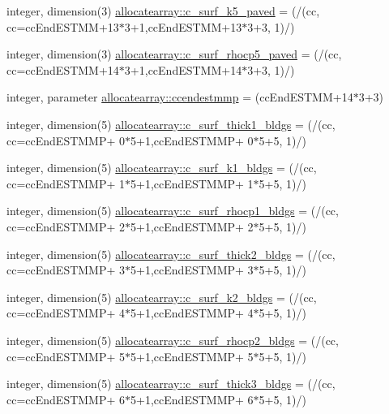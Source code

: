 \begin{DoxyCompactItemize}
\item 
integer, dimension(3) \hyperlink{namespaceallocatearray_a55ea661a6311737a605a66ff4d0686bb}{allocatearray\+::c\+\_\+surf\+\_\+k5\+\_\+paved} = (/(cc, cc=cc\+End\+E\+S\+T\+MM+13$\ast$3+1,cc\+End\+E\+S\+T\+MM+13$\ast$3+3, 1)/)
\item 
integer, dimension(3) \hyperlink{namespaceallocatearray_abfdcde71bd1c263d5cf829353a897407}{allocatearray\+::c\+\_\+surf\+\_\+rhocp5\+\_\+paved} = (/(cc, cc=cc\+End\+E\+S\+T\+MM+14$\ast$3+1,cc\+End\+E\+S\+T\+MM+14$\ast$3+3, 1)/)
\item 
integer, parameter \hyperlink{namespaceallocatearray_aea45a9a70b07fc8b92b8946a2b41e299}{allocatearray\+::ccendestmmp} = (cc\+End\+E\+S\+T\+MM+14$\ast$3+3)
\item 
integer, dimension(5) \hyperlink{namespaceallocatearray_ac6eb5a733ab48407dd1b0cd5d0bf4780}{allocatearray\+::c\+\_\+surf\+\_\+thick1\+\_\+bldgs} = (/(cc, cc=cc\+End\+E\+S\+T\+M\+MP+ 0$\ast$5+1,cc\+End\+E\+S\+T\+M\+MP+ 0$\ast$5+5, 1)/)
\item 
integer, dimension(5) \hyperlink{namespaceallocatearray_a24292d640a153248dd27a9d46e279457}{allocatearray\+::c\+\_\+surf\+\_\+k1\+\_\+bldgs} = (/(cc, cc=cc\+End\+E\+S\+T\+M\+MP+ 1$\ast$5+1,cc\+End\+E\+S\+T\+M\+MP+ 1$\ast$5+5, 1)/)
\item 
integer, dimension(5) \hyperlink{namespaceallocatearray_a54737eb445f1177103369c151c2c7116}{allocatearray\+::c\+\_\+surf\+\_\+rhocp1\+\_\+bldgs} = (/(cc, cc=cc\+End\+E\+S\+T\+M\+MP+ 2$\ast$5+1,cc\+End\+E\+S\+T\+M\+MP+ 2$\ast$5+5, 1)/)
\item 
integer, dimension(5) \hyperlink{namespaceallocatearray_a4d869e9f6bbea24bd21da74dc1adc704}{allocatearray\+::c\+\_\+surf\+\_\+thick2\+\_\+bldgs} = (/(cc, cc=cc\+End\+E\+S\+T\+M\+MP+ 3$\ast$5+1,cc\+End\+E\+S\+T\+M\+MP+ 3$\ast$5+5, 1)/)
\item 
integer, dimension(5) \hyperlink{namespaceallocatearray_a68884558810ea3ed48c5955a3fa9424f}{allocatearray\+::c\+\_\+surf\+\_\+k2\+\_\+bldgs} = (/(cc, cc=cc\+End\+E\+S\+T\+M\+MP+ 4$\ast$5+1,cc\+End\+E\+S\+T\+M\+MP+ 4$\ast$5+5, 1)/)
\item 
integer, dimension(5) \hyperlink{namespaceallocatearray_a2f5bad25e3bd8e03f5a04b8227c01703}{allocatearray\+::c\+\_\+surf\+\_\+rhocp2\+\_\+bldgs} = (/(cc, cc=cc\+End\+E\+S\+T\+M\+MP+ 5$\ast$5+1,cc\+End\+E\+S\+T\+M\+MP+ 5$\ast$5+5, 1)/)
\item 
integer, dimension(5) \hyperlink{namespaceallocatearray_a2cd78a5f2dd77b5bb37d6c6ced2829b5}{allocatearray\+::c\+\_\+surf\+\_\+thick3\+\_\+bldgs} = (/(cc, cc=cc\+End\+E\+S\+T\+M\+MP+ 6$\ast$5+1,cc\+End\+E\+S\+T\+M\+MP+ 6$\ast$5+5, 1)/)

\end{DoxyCompactItemize}
